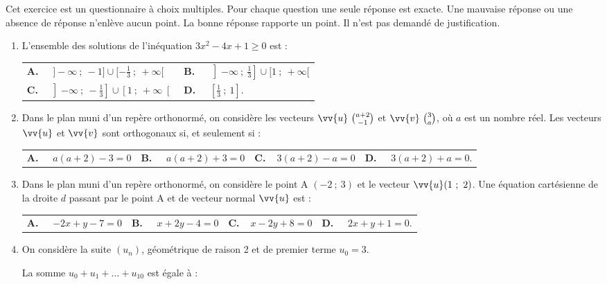 \medskip

Cet exercice est un questionnaire à choix multiples. Pour chaque question une seule réponse est exacte. Une mauvaise réponse ou une absence de réponse n'enlève aucun point. La bonne réponse rapporte un point. Il n'est pas demandé de justification.

\begin{enumerate}
\item  L'ensemble des solutions de l'inéquation $3x^2-4x+1\geqslant 0$ est :

\medskip

\begin{tabularx}{\linewidth}{*{2}{X}}
\textbf{A.~~} $]-\infty~;~-1]\cup[-\frac{1}{3}~;~+\infty[ $ &\textbf{B.~~} $ 
\left]-\infty~;~\frac{1}{3}\right]\cup [1~;~+\infty[$\\\textbf{C.~~}$\left]-\infty~;~-\frac{1}{3}\right]\cup\left[1~;~+\infty\right[ $& \textbf{D.~~} $ \left[\frac{1}{3}~;~1\right] $.
\end{tabularx}

\item Dans le plan muni d'un repère orthonormé, on considère les vecteurs $\vv{u} \ \binom{a+2}{-1}$ et $\vv{v}\ \binom{3}{a}$, où $a$ est un nombre réel. Les vecteurs $\vv{u}$ et $\vv{v}$ sont orthogonaux si, et seulement si :

\medskip

\begin{tabularx}{\linewidth}{*{4}{X}}
\textbf{A.~~} $ a(a+2)-3=0$ &\textbf{B.~~} $a(a+2)+3=0 $&\textbf{C.~~}$3(a+2)-a=0 $& \textbf{D.~~} $3(a+2)+a=0  $.
\end{tabularx}

\item Dans le plan muni d'un repère orthonormé, on considère le point A $(-2~;~3)$ et le vecteur $\vv{u} (1~;~2)$. Une équation cartésienne de la droite $d$ passant par le point A et de vecteur normal $\vv{u}$ est :

\medskip

\begin{tabularx}{\linewidth}{*{4}{X}}
\textbf{A.~~} $-2x+y-7=0 $ &\textbf{B.~~} $x+2y-4=0 $&\textbf{C.~~}$x-2y+8=0 $& \textbf{D.~~} $2x+y+1=0  $.
\end{tabularx}

\item On considère la suite $\left(u_n\right)$, géométrique de raison 2 et de premier terme $u_0=3$.

La somme $u_0+u_1+\dots+u_{10}$ est égale à :


\end{enumerate}
